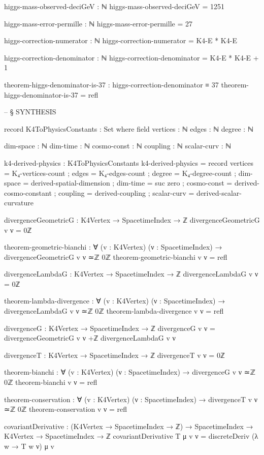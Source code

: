 \documentclass[11pt,a4paper]{book}
\begin{document}
\begin{code}
higgs-mass-observed-deciGeV : ℕ
higgs-mass-observed-deciGeV = 1251

higgs-mass-error-permille : ℕ
higgs-mass-error-permille = 27


higgs-correction-numerator : ℕ
higgs-correction-numerator = K4-E * K4-E

higgs-correction-denominator : ℕ
higgs-correction-denominator = K4-E * K4-E + 1

theorem-higgs-denominator-is-37 : higgs-correction-denominator ≡ 37
theorem-higgs-denominator-is-37 = refl


-- § SYNTHESIS

record K4ToPhysicsConstants : Set where
  field
    vertices : ℕ
    edges    : ℕ
    degree   : ℕ
    
    dim-space : ℕ
    dim-time  : ℕ
    cosmo-const : ℕ
    coupling : ℕ
    scalar-curv : ℕ

k4-derived-physics : K4ToPhysicsConstants
k4-derived-physics = record
  { vertices = K₄-vertices-count
  ; edges = K₄-edges-count
  ; degree = K₄-degree-count
  ; dim-space = derived-spatial-dimension
  ; dim-time = suc zero
  ; cosmo-const = derived-cosmo-constant
  ; coupling = derived-coupling
  ; scalar-curv = derived-scalar-curvature
  }

divergenceGeometricG : K4Vertex → SpacetimeIndex → ℤ
divergenceGeometricG v ν = 0ℤ

theorem-geometric-bianchi : ∀ (v : K4Vertex) (ν : SpacetimeIndex) → 
  divergenceGeometricG v ν ≃ℤ 0ℤ
theorem-geometric-bianchi v ν = refl

divergenceLambdaG : K4Vertex → SpacetimeIndex → ℤ
divergenceLambdaG v ν = 0ℤ

theorem-lambda-divergence : ∀ (v : K4Vertex) (ν : SpacetimeIndex) →
  divergenceLambdaG v ν ≃ℤ 0ℤ
theorem-lambda-divergence v ν = refl

divergenceG : K4Vertex → SpacetimeIndex → ℤ
divergenceG v ν = divergenceGeometricG v ν +ℤ divergenceLambdaG v ν

divergenceT : K4Vertex → SpacetimeIndex → ℤ
divergenceT v ν = 0ℤ

theorem-bianchi : ∀ (v : K4Vertex) (ν : SpacetimeIndex) → divergenceG v ν ≃ℤ 0ℤ
theorem-bianchi v ν = refl

theorem-conservation : ∀ (v : K4Vertex) (ν : SpacetimeIndex) → divergenceT v ν ≃ℤ 0ℤ
theorem-conservation v ν = refl

covariantDerivative : (K4Vertex → SpacetimeIndex → ℤ) → 
                       SpacetimeIndex → K4Vertex → SpacetimeIndex → ℤ
covariantDerivative T μ v ν = 
  discreteDeriv (λ w → T w ν) μ v


\end{code}
\end{document}

